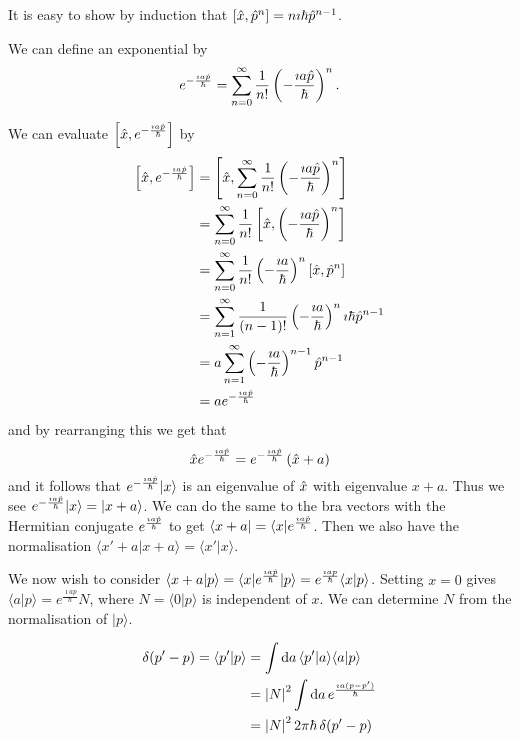 \documentclass{notes}
\newcommand{\bra}[1]{\langle#1|}
\newcommand{\ket}[1]{|#1\rangle}
\newcommand{\scp}[2]{\langle#1|#2\rangle}
\newcommand{\com}[2]{\left[#1,#2\right]}
\begin{document}
It is easy to show by induction that $\com{\Hat{x}}{\Hat{p}^n}
= n \imath \hbar \Hat{p}^{n-1}$.

We can define an exponential by
\[
e^{-\frac{\imath a \Hat{p}}{\hbar}} = \sum_{n=0}^\infty \frac{1}{n!}
\left(-\frac{\imath a \Hat{p}}{\hbar} \right)^n.
\]

We can evaluate $\com{\Hat{x}}{e^{-\frac{\imath a \Hat{p}}{\hbar}}}$
by
\begin{align*}
\com{\Hat{x}}{e^{-\frac{\imath a \Hat{p}}{\hbar}}}
&= \com{\Hat{x}}{\sum_{n=0}^\infty \frac{1}{n!}
\left(-\frac{\imath a \Hat{p}}{\hbar} \right)^n} \\
&= \sum_{n=0}^\infty \frac{1}{n!} \com{\Hat{x}}{\left(-\frac{\imath a \Hat{p}}
{\hbar} \right)^n} \\
&= \sum_{n=0}^\infty \frac{1}{n!} \left(-\frac{\imath a}{\hbar} \right)^n
\com{\Hat{x}}{\Hat{p}^n} \\
&= \sum_{n=1}^\infty \frac{1}{(n-1)!} \left(-\frac{\imath a}{\hbar} \right)^n
\imath \hbar \Hat{p}^{n-1} \\
&= a \sum_{n=1}^\infty \left(-\frac{\imath a}{\hbar} \right)^{n-1}
\Hat{p}^{n-1} \\
&= a e^{-\frac{\imath a \Hat{p}}{\hbar}}
\end{align*}
and by rearranging this we get that
\[
\Hat{x} e^{-\frac{\imath a \Hat{p}}{\hbar}}
= e^{-\frac{\imath a \Hat{p}}{\hbar}} \left(\Hat{x}+a\right)
\]
and it follows that $e^{-\frac{\imath a \Hat{p}}{\hbar}} \ket{x}$
is an eigenvalue of $\Hat{x}$ with eigenvalue $x+a$.  Thus we see
$e^{-\frac{\imath a \Hat{p}}{\hbar}} \ket{x} = \ket{x+a}$.  We
can do the same to the bra vectors with the Hermitian conjugate
$e^{\frac{\imath a \Hat{p}}{\hbar}}$ to get
$\bra{x+a} = \bra{x} e^{\frac{\imath a \Hat{p}}{\hbar}}$.  Then
we also have the normalisation ${\scp{x'+a}{x+a} = \scp{x'}{x}}$.

We now wish to consider $%
\scp{x+a}{p} = \bra{x} e^{\frac{\imath a \Hat{p}}{\hbar}} \ket{p}%
= e^{\frac{\imath a p}{\hbar}} \scp{x}{p}$.  Setting $x=0$
gives $\scp{a}{p} = e^{\frac{\imath a p}{\hbar}} N$, where
$N=\scp{0}{p}$ is independent of $x$.  We can determine $N$ from
the normalisation of $\ket{p}$.

\begin{align*}
\delta(p'-p) = \scp{p'}{p} &= \int \ud a\, \scp{p'}{a} \scp{a}{p}\\
&= \abs{N}^2 \int \ud a\, e^{\frac{\imath a (p-p') }{\hbar}} \\
&= \abs{N}^2 2 \pi \hbar\, \delta(p'-p)
\end{align*}
\end{document}
